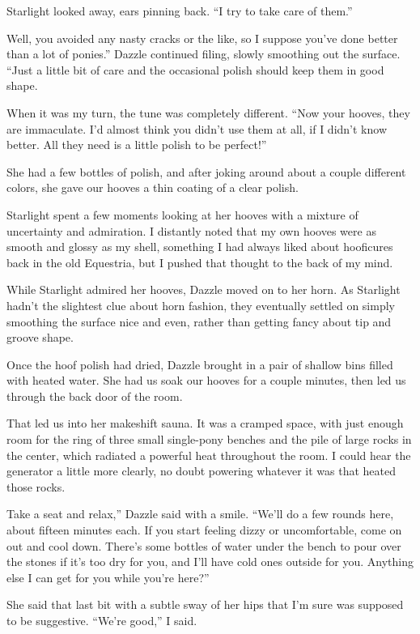 Starlight looked away, ears pinning back. “I try to take care of them.”

\leavevmode{}Well, you avoided any nasty cracks or the like, so I suppose you’ve done better than a lot of ponies.” Dazzle continued filing, slowly smoothing out the surface. “Just a little bit of care and the occasional polish should keep them in good shape.

When it was my turn, the tune was completely different. “Now your hooves, they are immaculate. I’d almost think you didn’t use them at all, if I didn’t know better. All they need is a little polish to be perfect!”

She had a few bottles of polish, and after joking around about a couple different colors, she gave our hooves a thin coating of a clear polish.

Starlight spent a few moments looking at her hooves with a mixture of uncertainty and admiration. I distantly noted that my own hooves were as smooth and glossy as my shell, something I had always liked about hooficures back in the old Equestria, but I pushed that thought to the back of my mind.

While Starlight admired her hooves, Dazzle moved on to her horn. As Starlight hadn’t the slightest clue about horn fashion, they eventually settled on simply smoothing the surface nice and even, rather than getting fancy about tip and groove shape.

Once the hoof polish had dried, Dazzle brought in a pair of shallow bins filled with heated water. She had us soak our hooves for a couple minutes, then led us through the back door of the room.

That led us into her makeshift sauna. It was a cramped space, with just enough room for the ring of three small single-pony benches and the pile of large rocks in the center, which radiated a powerful heat throughout the room. I could hear the generator a little more clearly, no doubt powering whatever it was that heated those rocks.

\leavevmode{}Take a seat and relax,” Dazzle said with a smile. “We’ll do a few rounds here, about fifteen minutes each. If you start feeling dizzy or uncomfortable, come on out and cool down. There’s some bottles of water under the bench to pour over the stones if it’s too dry for you, and I’ll have cold ones outside for you. Anything else I can get for you while you’re here?”

She said that last bit with a subtle sway of her hips that I’m sure was supposed to be suggestive. “We’re good,” I said.

